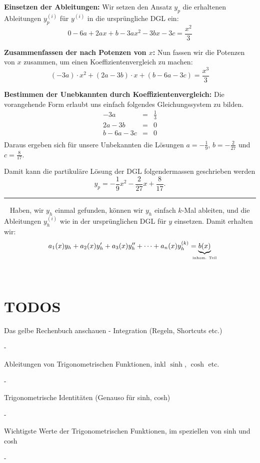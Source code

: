 \documentclass[a4paper,landscape,8pt]{extarticle}
\newcommand{\sep}{\vspace{5pt}\noindent\hrule\vspace{5pt}}
\renewcommand*{\newpage}{ \ }
\begin{document}
\begin{multicols*}{4}
\begin{warmup}
\begin{warmup}
\textbf{Einsetzen der Ableitungen:} Wir setzen den Ansatz $y_p$ die erhaltenen
Ableitungen $y_p^{(i)}$ für $y^{(i)}$ in die ursprüngliche DGL ein:
\[
0 -6a + 2ax + b -3ax^2 -3bx -3c = \frac{x^2}{3}
\]

\textbf{Zusammenfassen der nach Potenzen von $x$:} Nun fassen wir die Potenzen
von $x$ zusammen, um einen Koeffizientenvergleich zu machen:
\[
(-3a)\cdot x^2	+ (2a-3b)\cdot x + (b-6a-3c) = \frac{x^3}{3}
\]

\textbf{Bestimmen der Unebkannten durch Koeffizientenvergleich:} Die
vorangehende Form erlaubt uns einfach folgendes Gleichungssystem zu bilden.
\[
\begin{array} {|rcl|} 
-3a &= &\frac{1}{3}\\
2a -3b &= &0\\
b -6a -3c &= &0\\
\end{array}
\]
Daraus ergeben sich für unsere Unbekannten die Lösungen $a=-\frac{1}{9}$,
$b=-\frac{2}{27}$ und $c=\frac{8}{17}$.

Damit kann die partikuläre Lösung der DGL folgendermassen geschrieben werden
\[
y_p = -\frac{1}{9}x^2 -\frac{2}{27}x + \frac{8}{17}.
\]

\sep 

\newpage
 Haben, wir $y_h$
  einmal gefunden, können wir $y_h$ einfach $k$-Mal ableiten, und die
  Ableitungen $y_h^{(i)}$ wie in der ursprünglichen DGL für $y$ einsetzen. Damit
  erhalten wir:
  \[
	a_1(x)y_h + a_2(x)y_h' + a_3(x)y_h^{\prime\prime} + \cdots + a_n(x)y_h^{(k)} =
	\underbrace{b(x)}_{\makebox[0pt]{\text{\tiny inhom. Teil}}}
  \]
\end{warmup}

\newpage

\section{TODOS}

Das gelbe Rechenbuch anschauen - Integration (Regeln, Shortcuts etc.)

-

Ableitungen von Trigonometrischen Funktionen, inkl $\sinh$, $\cosh$ etc.

- 

Trigonometrische Identitäten  (Genauso für sinh, cosh)

-

Wichtigste Werte der Trigonometrischen Funktionen, im speziellen von sinh und
cosh

-


\end{warmup}
\end{multicols*}
\end{document}
